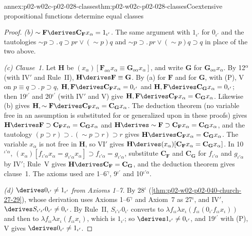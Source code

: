 \begin{annexitem}{annex:p02-w02c-p02-028-classes}{thm:p02-w02c-p02-028-classes}{Coextensive propositional functions determine equal classes}
\begin{proof}
\emph{(b) \(\sim\mathbf F\derives\mathbf C_{\mathbf F}x_\alpha=1_{\iota'}\).}
The same argument with \(1_{\iota'}\) for \(0_{\iota'}\) and the
tautologies \(\sim p\supset.\,q\supset pr\vee(\sim p)q\) and
\(\sim p\supset.\,pr\vee(\sim p)q\supset q\) in place of the two above.

\emph{(c) Clause~1.}  Let \(\mathbf H\) be
\((x_\alpha)[\mathbf F_{o\alpha}x_\alpha\equiv\mathbf G_{o\alpha}x_\alpha]\),
and write \(\mathbf G\) for \(\mathbf G_{o\alpha}x_\alpha\).  By
12\(^\alpha\) (with IV\('\) and Rule~II), \(\mathbf H\derives\mathbf F\equiv\mathbf G\).
By (a) for \(\mathbf F\) and for \(\mathbf G\), with (P), V on
\(p\equiv q\supset.\,p\supset q\),
\(\mathbf H,\mathbf F\derives\mathbf C_{\mathbf F}x_\alpha=0_{\iota'}\) and
\(\mathbf H,\mathbf F\derives\mathbf C_{\mathbf G}x_\alpha=0_{\iota'}\); then
19\(^{\iota'}\) and 20\(^{\iota'}\) (with IV\('\) and V) give
\(\mathbf H,\mathbf F\derives\mathbf C_{\mathbf F}x_\alpha=\mathbf C_{\mathbf G}x_\alpha\).
Likewise (b) gives
\(\mathbf H,\sim\mathbf F\derives\mathbf C_{\mathbf F}x_\alpha=\mathbf C_{\mathbf G}x_\alpha\).
The deduction theorem (no variable free in an assumption is substituted for
or generalized upon in these proofs) gives
\(\mathbf H\derives\mathbf F\supset\mathbf C_{\mathbf F}x_\alpha=\mathbf C_{\mathbf G}x_\alpha\)
and
\(\mathbf H\derives\sim\mathbf F\supset\mathbf C_{\mathbf F}x_\alpha=\mathbf C_{\mathbf G}x_\alpha\),
and the tautology \((p\supset r)\supset.\,(\sim p\supset r)\supset r\) gives
\(\mathbf H\derives\mathbf C_{\mathbf F}x_\alpha=\mathbf C_{\mathbf G}x_\alpha\).
The variable \(x_\alpha\) is not free in \(\mathbf H\), so VI\('\) gives
\(\mathbf H\derives(x_\alpha)[\mathbf C_{\mathbf F}x_\alpha=\mathbf C_{\mathbf G}x_\alpha]\).
In 10\(^{\iota'\alpha}\),
\((x_\alpha)[f_{\iota'\alpha}x_\alpha=g_{\iota'\alpha}x_\alpha]\supset f_{\iota'\alpha}=g_{\iota'\alpha}\),
substitute \(\mathbf C_{\mathbf F}\) and \(\mathbf C_{\mathbf G}\) for
\(f_{\iota'\alpha}\) and \(g_{\iota'\alpha}\) by IV\('\); Rule~V gives
\(\mathbf H\derives\mathbf C_{\mathbf F}=\mathbf C_{\mathbf G}\), and the
deduction theorem gives clause~1.  The axioms used are 1--6\(^\gamma\),
9\(^{\iota'}\) and 10\(^{\iota'\alpha}\).

\emph{(d) \(\derives0_{\iota'}\ne1_{\iota'}\) from Axioms 1--7.}  By
28\(^\iota\) (\cref{thm:p02-w02-p02-040-church-27-29}), whose derivation uses
Axioms 1--6\(^\gamma\) and Axiom~7 as 27\(^\iota\), and IV\('\),
\(\derives S_{\iota'\iota'}0_{\iota'}\ne0_{\iota'}\).  By Rule~II,
\(S_{\iota'\iota'}0_{\iota'}\) converts to
\(\lambda f_{\iota\iota}\lambda x_\iota(f_{\iota\iota}(0_{\iota'}f_{\iota\iota}x_\iota))\)
and then to \(\lambda f_{\iota\iota}\lambda x_\iota(f_{\iota\iota}x_\iota)\),
which is \(1_{\iota'}\); so \(\derives1_{\iota'}\ne0_{\iota'}\), and
19\(^{\iota'}\) with (P), V gives \(\derives0_{\iota'}\ne1_{\iota'}\).


\end{proof}
\end{annexitem}
